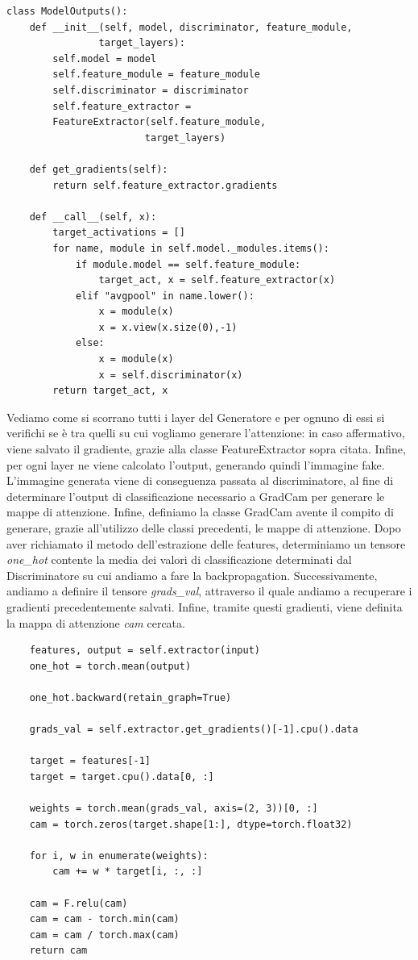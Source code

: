 \begin{verbatim}
class ModelOutputs():
    def __init__(self, model, discriminator, feature_module,
                target_layers):
        self.model = model
        self.feature_module = feature_module
        self.discriminator = discriminator
        self.feature_extractor =
        FeatureExtractor(self.feature_module,
                        target_layers)

    def get_gradients(self):
        return self.feature_extractor.gradients

    def __call__(self, x):
        target_activations = []
        for name, module in self.model._modules.items():
            if module.model == self.feature_module:
                target_act, x = self.feature_extractor(x)
            elif "avgpool" in name.lower():
                x = module(x)
                x = x.view(x.size(0),-1)
            else:
                x = module(x)
                x = self.discriminator(x)
        return target_act, x

\end{verbatim}
Vediamo come si scorrano tutti i layer del Generatore e per ognuno di essi si verifichi se è tra quelli su cui vogliamo generare l'attenzione: in caso affermativo, viene salvato il gradiente, grazie alla classe FeatureExtractor sopra citata. Infine, per ogni layer ne viene calcolato l'output, generando quindi l'immagine fake. L'immagine generata viene di conseguenza passata al discriminatore, al fine di determinare l'output di classificazione necessario a GradCam per generare le mappe di attenzione.
Infine, definiamo la classe GradCam avente il compito di generare, grazie all'utilizzo delle classi precedenti, le mappe di attenzione.
Dopo aver richiamato il metodo dell'estrazione delle features, determiniamo un tensore \emph{one\_hot} contente la media dei valori di classificazione determinati dal Discriminatore su cui andiamo a fare la backpropagation. Successivamente, andiamo a definire il tensore \emph{grads\_val}, attraverso il quale andiamo a recuperare i gradienti precedentemente salvati. Infine, tramite questi gradienti, viene definita la mappa di attenzione \emph{cam} cercata.
\begin{verbatim}
    features, output = self.extractor(input)
    one_hot = torch.mean(output)
    
    one_hot.backward(retain_graph=True)

    grads_val = self.extractor.get_gradients()[-1].cpu().data

    target = features[-1]
    target = target.cpu().data[0, :]

    weights = torch.mean(grads_val, axis=(2, 3))[0, :]
    cam = torch.zeros(target.shape[1:], dtype=torch.float32)

    for i, w in enumerate(weights):
        cam += w * target[i, :, :]

    cam = F.relu(cam)
    cam = cam - torch.min(cam)
    cam = cam / torch.max(cam)
    return cam
\end{verbatim}

